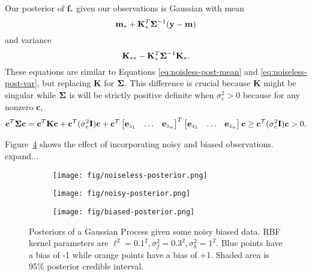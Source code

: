 Our posterior of $\mathbf{f}_*$ given our observations is Gaussian with mean
\begin{equation*}
    \mathbf{m}_* + \mathbf{K}_*^T \boldsymbol{\Sigma}^{-1} (\mathbf{y} - \mathbf{m})
\end{equation*}
and variance
\begin{equation*}
    \mathbf{K}_{* *} - \mathbf{K}_*^T \boldsymbol{\Sigma}^{-1} \mathbf{K}_*.
\end{equation*}
These equations are similar to Equations \ref{eq:noisless-post-mean} and \ref{eq:noiseless-post-var},
but replacing $\mathbf{K}$ for $\boldsymbol{\Sigma}$.
This difference is crucial because $\mathbf{K}$ might be singular
while $\boldsymbol{\Sigma}$ is will be strictly positive definite when $\sigma_e^2 > 0$ because for any nonzero $\mathbf{c}$,
\begin{align*}
    \mathbf{c}^{T} \boldsymbol{\Sigma} \mathbf{c}
    = \mathbf{c}^{T} \mathbf{K} \mathbf{c}
    + \mathbf{c}^{T} (\sigma^2_e \mathbf{I}) \mathbf{c} 
    +
    \mathbf{c}^{T}
    \begin{bmatrix}
        \mathbf{e}_{z_1} & \hdots & \mathbf{e}_{z_n}
    \end{bmatrix}^{ T}
     \begin{bmatrix}
        \mathbf{e}_{z_1} & \hdots & \mathbf{e}_{z_n}
    \end{bmatrix}
    \mathbf{c} \geq \mathbf{c}^{T} (\sigma^2_e \mathbf{I}) \mathbf{c}
    > 0.
\end{align*}


Figure~\ref{fig:gp-posteriors} shows the effect of incorporating noisy and biased observations.
expand...

\begin{figure}
    \centering
    \begin{subfigure}[b]{0.3\textwidth}
        \centering
        \texttt{[image: fig/noiseless-posterior.png]}
        \caption{}
        \label{subfig:noiseless-post}
    \end{subfigure}
    \hfill
    \begin{subfigure}[b]{0.3\textwidth}
        \centering
        \texttt{[image: fig/noisy-posterior.png]}
        \caption{}
        \label{subfig:noisy-posterior}
    \end{subfigure}
    \hfill
    \begin{subfigure}[b]{0.3\textwidth}
        \centering
        \texttt{[image: fig/biased-posterior.png]}
        \caption{}
        \label{subfig:biased-posterior}
    \end{subfigure}
    \hfill
    \caption{Posteriors of a Gaussian Process given some noisy biased data.
        RBF kernel parameters are $\ell^{2} = 0.1^2, \sigma^2_{f} = 0.3 ^ 2, \sigma^2_b = 1^2$.
        Blue points have a bias of -1 while orange points have a bias of +1.
        Shaded area is 95\% posterior credible interval.
    }
    \label{fig:gp-posteriors}
\end{figure}
